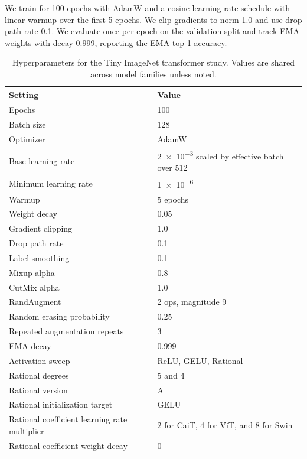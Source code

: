 \documentclass{article}
\theoremstyle{plain}
\theoremstyle{definition}
\theoremstyle{remark}
\begin{document}
We train for 100 epochs with AdamW and a cosine learning rate schedule with linear warmup over the first 5 epochs. We clip gradients to norm 1.0 and use drop path rate 0.1. We evaluate once per epoch on the validation split and track EMA weights with decay 0.999, reporting the EMA top 1 accuracy.

\begin{table}
\centering
\caption{Hyperparameters for the Tiny ImageNet transformer study. Values are shared across model families unless noted.}
\label{tab:tinyimg_hparams}
\footnotesize
\begin{tabular}{@{}p{}p{}@{}}
\toprule
Setting & Value \\
\midrule
Epochs & 100 \\
Batch size & 128 \\
Optimizer & AdamW \\
Base learning rate & \num{2e-3} scaled by effective batch over 512 \\
Minimum learning rate & \num{1e-6} \\
Warmup & 5 epochs \\
Weight decay & 0.05 \\
Gradient clipping & 1.0 \\
Drop path rate & 0.1 \\
Label smoothing & 0.1 \\
Mixup alpha & 0.8 \\
CutMix alpha & 1.0 \\
RandAugment & 2 ops, magnitude 9 \\
Random erasing probability & 0.25 \\
Repeated augmentation repeats & 3 \\
EMA decay & 0.999 \\
\addlinespace
Activation sweep & ReLU, GELU, Rational \\
Rational degrees & 5 and 4 \\
Rational version & A \\
Rational initialization target & GELU \\
Rational coefficient learning rate multiplier & 2 for CaiT, 4 for ViT, and 8 for Swin \\
Rational coefficient weight decay & 0 \\
\bottomrule
\end{tabular}
\end{table}
\end{document}
